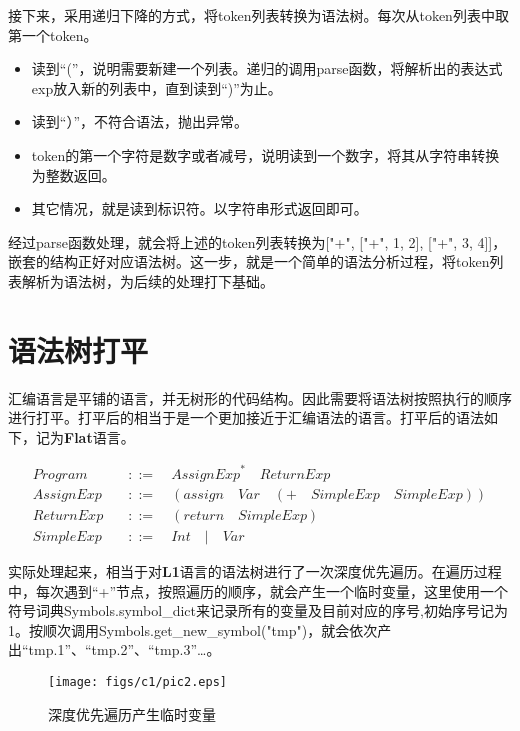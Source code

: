 接下来，采用递归下降的方式，将token列表转换为语法树。每次从token列表中取第一个token。
\begin{itemize}
  \item 读到“(”，说明需要新建一个列表。递归的调用parse函数，将解析出的表达式exp放入新的列表中，直到读到“)”为止。
  \item 读到“）”，不符合语法，抛出异常。
  \item token的第一个字符是数字或者减号，说明读到一个数字，将其从字符串转换为整数返回。
  \item 其它情况，就是读到标识符。以字符串形式返回即可。
\end{itemize}

经过parse函数处理，就会将上述的token列表转换为["+", ["+", 1, 2], ["+", 3, 4]]，嵌套的结构正好对应语法树。这一步，就是一个简单的语法分析过程，将token列表解析为语法树，为后续的处理打下基础。

\section{语法树打平}

汇编语言是平铺的语言，并无树形的代码结构。因此需要将语法树按照执行的顺序进行打平。打平后的相当于是一个更加接近于汇编语法的语言。打平后的语法如下，记为\textbf{Flat}语言。

\begin{equation}
\begin{aligned}
  \label{eq:3}
   Program \quad &::= \quad {AssignExp}^* \quad ReturnExp \\
   AssignExp \quad &::= \quad (assign \quad Var \quad (+ \quad SimpleExp \quad SimpleExp)) \\
   ReturnExp \quad &::= \quad (return \quad SimpleExp) \\
   SimpleExp \quad &::=  \quad Int \quad | \quad Var
\end{aligned}
\end{equation}

实际处理起来，相当于对\textbf{L1}语言的语法树进行了一次深度优先遍历。在遍历过程中，每次遇到“+”节点，按照遍历的顺序，就会产生一个临时变量，这里使用一个符号词典Symbols.symbol\_dict来记录所有的变量及目前对应的序号,初始序号记为1。按顺次调用Symbols.get\_new\_symbol("tmp")，就会依次产出“tmp.1”、“tmp.2”、“tmp.3”…。

\begin{figure}[ht]
\centering
\texttt{[image: figs/c1/pic2.eps]}
\caption{深度优先遍历产生临时变量}
\label{fig:fig2}
\end{figure}


